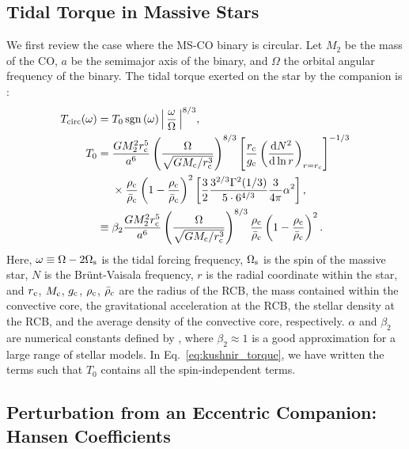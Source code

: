 \documentclass[
        fleqn,
        usenatbib,
    ]{mnras}
\newcommand*{\rd}[2]{\frac{\mathrm{d}#1}{\mathrm{d}#2}}
\newcommand*{\p}[1]{\left(#1\right)}
\newcommand*{\s}[1]{\left[#1\right]}
\DeclareMathOperator*{\sgn}{sgn}
\begin{document}
\subsection{Tidal Torque in Massive Stars}

We first review the case where the MS-CO binary is circular. Let $M_2$ be the
mass of the CO, $a$ be the semimajor axis of the binary, and $\Omega$ the
orbital angular frequency of the binary. The tidal torque exerted on the star by
the companion is \citep{kushnir}:
\begin{align}
    T_{\rm circ}(\omega) ={}& T_0 \sgn\p{\omega}
        \Big|\,\frac{\omega}{\Omega}\,\Big|^{8/3} \label{eq:kushnir_torque},\\
    T_0 ={}& \frac{GM_2^2r_{\rm c}^5}{a^6}
        \p{\frac{\Omega}{\sqrt{GM_{\rm c}/r_{\rm c}^3}}}^{8/3}
        \s{\frac{r_{\rm c}}{g_{\rm c}}
            \p{\rd{N^2}{\ln r}}_{r = r_{\rm c}}}^{-1/3}\nonumber\\
            &\times \frac{\rho_{\rm c}}{\bar{\rho}_{\rm c}}
                \p{1 - \frac{\rho_{\rm c}}{\bar{\rho}_{\rm c}}}^2
                \s{\frac{3}{2}\frac{3^{2/3}\Gamma^2(1/3)}{5 \cdot
                6^{4/3}} \frac{3}{4\pi}\alpha^2},\nonumber\\
        \equiv{}& \beta_2\frac{GM_2^2r_{\rm c}^5}{a^6}
            \p{\frac{\Omega}{\sqrt{GM_{\rm c}/r_{\rm c}^3}}}^{8/3}
            \frac{\rho_{\rm c}}{\bar{\rho}_{\rm c}} \p{1 - \frac{\rho_{\rm
            c}}{\bar{\rho}_{\rm c}}}^2.
\end{align}
Here, $\omega \equiv \Omega - 2\Omega_{\rm s}$ is the tidal forcing frequency,
$\Omega_{\rm s}$ is the spin of the massive star, $N$ is the Br\"unt-Vaisala
frequency, $r$ is the radial coordinate within the star, and $r_{\rm c}$,
$M_{\rm c}$, $g_{\rm c}$, $\rho_{\rm c}$, $\bar{\rho}_{\rm c}$ are the radius of
the RCB, the mass contained within the convective core, the gravitational
acceleration at the RCB, the stellar density at the RCB, and the average density
of the convective core, respectively. $\alpha$ and $\beta_2$ are numerical
constants defined by \citet{kushnir}, where $\beta_2 \approx 1$ is a good
approximation for a large range of stellar models. In
Eq.~\eqref{eq:kushnir_torque}, we have written the terms such that $T_0$
contains all the spin-independent terms.

\subsection{Perturbation from an Eccentric Companion: Hansen Coefficients}
\end{document}
